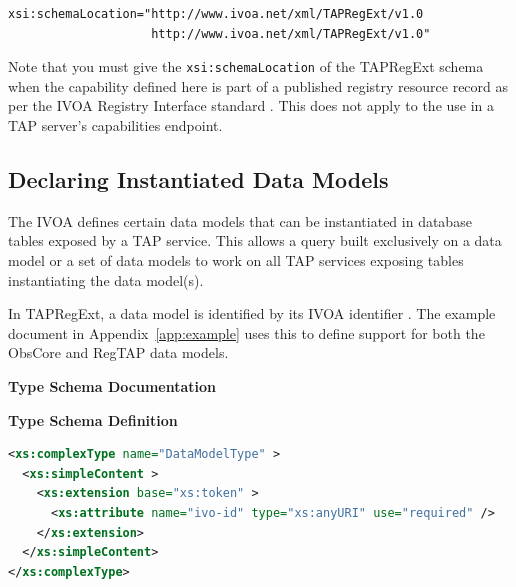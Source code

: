 \documentclass{ivoa}
\begin{document}
\begin{verbatim}
xsi:schemaLocation="http://www.ivoa.net/xml/TAPRegExt/v1.0
                    http://www.ivoa.net/xml/TAPRegExt/v1.0"
\end{verbatim}

Note that you must give the \texttt{xsi:schemaLocation} of
the TAPRegExt schema when the capability defined here is part of a published
registry resource record as per the IVOA Registry Interface standard 
\citep{std:RI1}.  This does not apply to the use
in a TAP server's capabilities endpoint.


\subsection{Declaring Instantiated Data Models}

\label{dms}

The IVOA defines certain data models that can be instantiated in database
tables exposed by a TAP service.  This allows a query built exclusively
on a data model or a set of data models to work on all TAP services exposing
tables instantiating the data model(s).

In TAPRegExt, a data model is identified by its IVOA identifier
\citep{std:VOID}.  The example document in Appendix~\ref{app:example}
uses this to define support for both the ObsCore and RegTAP data models.

\begingroup
      	\renewcommand*\descriptionlabel[1]{%
      	\hbox to 5.5em{\emph{#1}\hfil}}\vspace{2ex}\noindent\textbf{ Type Schema Documentation}


\vspace{1ex}\noindent\textbf{ Type Schema Definition}

\begin{lstlisting}[language=XML,basicstyle=\footnotesize]
<xs:complexType name="DataModelType" >
  <xs:simpleContent >
    <xs:extension base="xs:token" >
      <xs:attribute name="ivo-id" type="xs:anyURI" use="required" />
    </xs:extension>
  </xs:simpleContent>
</xs:complexType>
\end{lstlisting}
\end{document}
